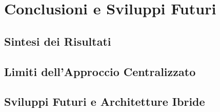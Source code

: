 \chapter{Conclusioni e Sviluppi Futuri}
\label{chap:conclusioni}

\section{Sintesi dei Risultati}

\section{Limiti dell'Approccio Centralizzato}

\section{Sviluppi Futuri e Architetture Ibride}